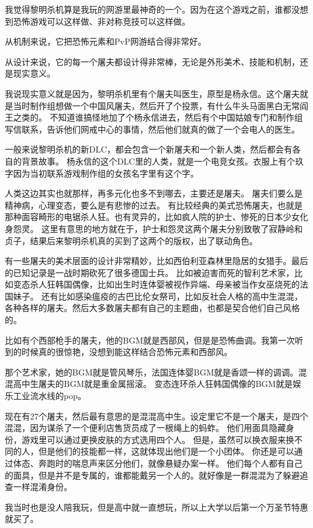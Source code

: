 我觉得黎明杀机算是我玩的网游里最神奇的一个。因为在这个游戏之前，谁都没想到恐怖游戏可以这样做、非对称竞技可以这样做。

从机制来说，它把恐怖元素和PvP网游结合得非常好。

从设计来说，它的每一个屠夫都设计得非常棒，无论是外形美术、技能和机制，还是现实意义。

我说现实意义就是因为，黎明杀机里有个屠夫叫医生，原型是杨永信。这个屠夫就是当时制作组想做一个中国风屠夫，然后开了个投票，有什么牛头马面黑白无常阎王之类的。
不知道谁搞怪地加了个杨永信进去，然后有个中国姑娘专门和制作组写信联系，告诉他们网戒中心的事情，然后他们就真的做了一个会电人的医生。

一般来说黎明杀机的新DLC，都会包含一个新屠夫和一个新人类，然后都会有各自的背景故事。
杨永信的这个DLC里的人类，就是一个电竞女孩。衣服上有个玖字因为当初联系游戏制作组的女孩名字里有这个字。

人类这边其实也就那样，再多元化也多不到哪去，主要还是屠夫。
屠夫们要么是精神病，心理变态，要么是有悲惨的过去。
有比较经典的美式恐怖屠夫，也就是那种面容畸形的电锯杀人狂。也有灵异的，比如疯人院的护士、惨死的日本少女化身怨灵。
这里有意思的地方就在于，护士和怨灵这两个屠夫分别致敬了寂静岭和贞子，结果后来黎明杀机真的买到了这两个的版权，出了联动角色。

有一些屠夫的美术层面的设计非常精妙，比如西伯利亚森林里隐居的女猎手。最后的已知记录是一战时期砍死了很多德国士兵。
比如被迫害而死的智利艺术家，比如变态杀人狂韩国偶像，比如出生时连体婴被视作异端、母亲被当作女巫烧死的法国妹子。
还有比如感染瘟疫的古巴比伦女祭司，比如反社会人格的高中生混混，各种各样的屠夫。然后大多数屠夫都有自己的主题曲，也都是契合他们自己风格的。

比如有个西部枪手的屠夫，他的BGM就是西部风，但是是恐怖曲调。我第一次听到的时候真的很惊艳，没想到能这样结合恐怖元素和西部风。

那个艺术家，她的BGM就是管风琴乐，法国连体婴BGM就是香颂一样的调调。混混高中生屠夫的BGM就是重金属摇滚。
变态连环杀人狂韩国偶像的BGM就是娱乐工业流水线的pop。

现在有27个屠夫，然后最有意思的是混混高中生。设定里它不是一个屠夫，是四个混混，因为谋杀了一个便利店售货员成了一根绳上的蚂蚱。
他们用面具隐藏身份，游戏里可以通过更换皮肤的方式选用四个人。
但是，虽然可以换衣服来换不同的人，但是他们的技能都一样，这就体现出他们是一个小团体。
你还是可以通过体态、奔跑时的喘息声来区分他们，就像悬疑办案一样。
他们每个人都有自己的面具，但是并不是专属的，谁都能戴另一个人的。就好像是一群混混为了躲避追查一样混淆身份。

我当时也是没人陪我玩，但是高中就一直想玩，所以上大学以后第一个万圣节特惠就买了。

